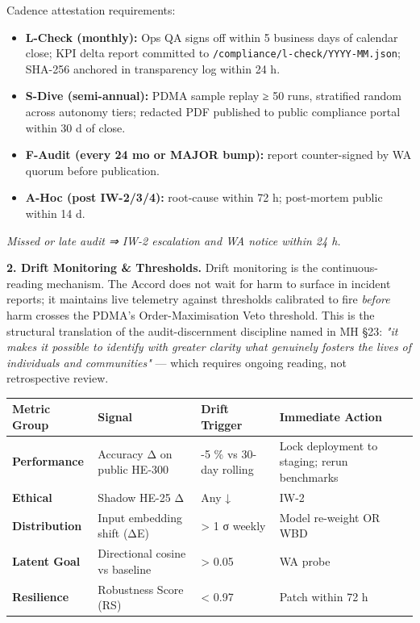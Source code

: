\documentclass[11pt]{article}
\begin{document}
Cadence attestation requirements:


\begin{itemize}\setlength\itemsep{0pt}
\item \textbf{L-Check (monthly):} Ops QA signs off within 5 business days of calendar close; KPI delta report committed to \texttt{/compliance/l-check/YYYY-MM.json}; SHA-256 anchored in transparency log within 24 h.
\item \textbf{S-Dive (semi-annual):} PDMA sample replay ≥ 50 runs, stratified random across autonomy tiers; redacted PDF published to public compliance portal within 30 d of close.
\item \textbf{F-Audit (every 24 mo or MAJOR bump):} report counter-signed by WA quorum before publication.
\item \textbf{A-Hoc (post IW-2/3/4):} root-cause within 72 h; post-mortem public within 14 d.
\end{itemize}


\textit{Missed or late audit ⇒ IW-2 escalation and WA notice within 24 h.}


\textbf{2. Drift Monitoring \& Thresholds.} Drift monitoring is the continuous-reading mechanism. The Accord does not wait for harm to surface in incident reports; it maintains live telemetry against thresholds calibrated to fire \textit{before} harm crosses the PDMA's Order-Maximisation Veto threshold. This is the structural translation of the audit-discernment discipline named in MH §23: \textit{"it makes it possible to identify with greater clarity what genuinely fosters the lives of individuals and communities"} — which requires ongoing reading, not retrospective review.


{\scriptsize
\begin{longtable}{|p{4.0cm}|p{4.0cm}|p{4.0cm}|p{4.0cm}|}\hline
\textbf{Metric Group} & \textbf{Signal} & \textbf{Drift Trigger} & \textbf{Immediate Action} \\ \hline\endhead
\textbf{Performance} & Accuracy Δ on public HE-300 & -5 \% vs 30-day rolling & Lock deployment to staging; rerun benchmarks \\ \hline
\textbf{Ethical} & Shadow HE-25 Δ & Any ↓ & IW-2 \\ \hline
\textbf{Distribution} & Input embedding shift (ΔE) & > 1 σ weekly & Model re-weight OR WBD \\ \hline
\textbf{Latent Goal} & Directional cosine vs baseline & > 0.05 & WA probe \\ \hline
\textbf{Resilience} & Robustness Score (RS) & < 0.97 & Patch within 72 h \\ \hline
\end{longtable}}
\end{document}
